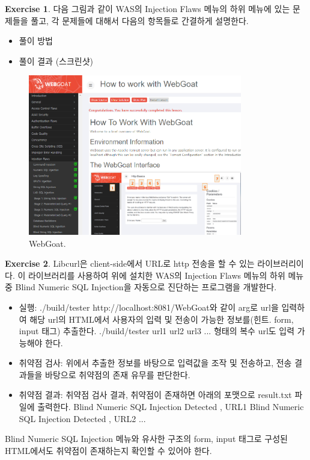 \documentclass[a4paper, 11pt]{article}
\theoremstyle{definition}
\newtheorem{exercise}{Exercise}
\begin{document}
\begin{exercise}

다음 그림과 같이 WAS의 Injection Flaws 메뉴의 하위 메뉴에 있는 문제들을 풀고, 각 문제들에 대해서 다음의 항목들로 간결하게 설명한다. 

\begin{itemize}
  \item 풀이 방법
  \item 풀이 결과 (스크린샷)
\end{itemize}

\begin{figure}[h]
  \includegraphics[height=7cm]{webgoat.png}
  \caption{WebGoat.}
  \label{fig:webgoat}
\end{figure}

\end{exercise}

\begin{exercise}

Libcurl\cite{libcurl}은 client-side에서 URL로 http 전송을 할 수 있는 라이브러리이다. 이 라이브러리를 사용하여 위에 설치한 WAS의 Injection Flaws 메뉴의 하위 메뉴 중 Blind Numeric SQL Injection을 자동으로 진단하는 프로그램을 개발한다. 

\begin{itemize}
  \item 실행: ./build/tester http://localhost:8081/WebGoat와 같이 arg로 url을 입력하여 해당 url의 HTML에서 사용자의 입력 및 전송이 가능한 정보를(힌트. form, input 태그) 추출한다. \cite{href} ./build/tester url1  url2  url3 ... 형태의 복수 url도 입력 가능해야 한다.  
  \item 취약점 검사: 위에서 추출한 정보를 바탕으로 입력값을 조작 및 전송하고,\cite{post} 전송 결과들을 바탕으로 취약점의 존재 유무를 판단한다. \cite{getinfo}
  \item 취약점 결과: 취약점 검사 결과, 취약점이 존재하면 아래의 포맷으로 result.txt 파일에 출력한다. \newline  
  Blind Numeric SQL Injection Detected , URL1 \newline 
  Blind Numeric SQL Injection Detected , URL2 \newline
                     ...  
\end{itemize}

Blind Numeric SQL Injection 메뉴와 유사한 구조의 form, input 태그로 구성된 HTML에서도 취약점이 존재하는지 확인할 수 있어야 한다. 

\end{exercise}
\end{document}
